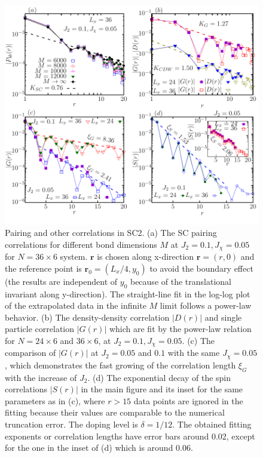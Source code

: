 \documentclass[aps,prx,reprint,superscriptaddress,showpacs]{revtex4-2}
\newcommand{\oim}[1]{{\color{blue} #1}}
\begin{document}
\begin{figure}
\centering
\includegraphics[width=1\linewidth]{SC_density_correlation_fit_new.pdf}
\caption{Pairing and other correlations in SC2. (a) The SC pairing correlations for different  bond dimensions $M$ at $J_{2}=0.1,J_{\chi}=0.05$ for $N=36\times 6$ system. $\mathbf{r}$ is chosen along x-direction $\mathbf{r}=(r,0)$ and the reference point is $\mathbf{r}_{0}=(L_{x}/4,y_{0})$ to avoid the boundary effect (the results are independent of $y_{0}$ because of the translational invariant along y-direction). The  straight-line fit in the log-log plot of the extrapolated data in the infinite $M$ limit follows a power-law behavior. (b) The density-density correlation $\left |D(r)\right |$ and single particle correlation $\left |G(r)\right |$ which are fit by the power-law relation for $N=24\times 6$ and $36\times 6$, at $J_{2}=0.1,J_{\chi}=0.05$.
(c) The comparison of $\left |G(r)\right |$ at $J_{2}=0.05$ and $0.1$ with  the same $J_{\chi}=0.05$, which demonstrates the fast growing of the correlation length $\xi_G$ with the increase of $J_{2}$. (d) The exponential decay of the spin correlations $\left |S(r)\right |$ in the main figure and its inset for the same parameters as in (c), where $r > 15$ data points are  ignored in the fitting  because their values are comparable to the numerical truncation error. \oim{The doping level is $\delta=1/12$. The obtained fitting exponents or correlation lengths have error bars around 0.02, except for the one in the inset of (d) which is around 0.06.}}
\label{Fig_SC_correlation}
\end{figure}
\end{document}
